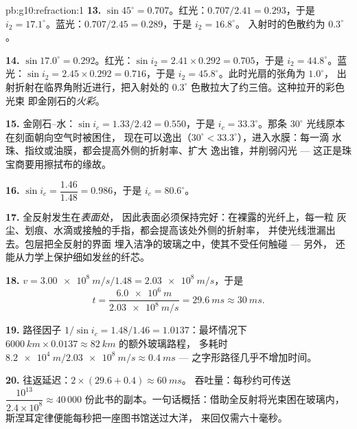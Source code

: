 \begin{solution}{pb:g10:refraction:1}
\textbf{13.} $\sin 45^\circ = 0.707$。红光：$0.707/2.41 = 0.293$，于是
$i_2 = 17.1^\circ$。蓝光：$0.707/2.45 = 0.289$，于是 $i_2 = 16.8^\circ$。
入射时的色散约为 $0.3^\circ$。

\textbf{14.} $\sin 17.0^\circ = 0.292$。红光：$\sin i_2 = 2.41 \times
0.292 = 0.705$，于是 $i_2 = 44.8^\circ$。蓝光：$\sin i_2 = 2.45 \times
0.292 = 0.716$，于是 $i_2 = 45.8^\circ$。此时光扇的张角为 $1.0^\circ$，
出射折射在临界角附近进行，把入射处的
$0.3^\circ$ 色散拉大了约三倍。这种拉开的彩色光束
即金刚石的\emph{火彩}。

\textbf{15.} 金刚石--水：$\sin i_c = 1.33/2.42 = 0.550$，于是
$i_c = 33.3^\circ$。那条 $30^\circ$ 光线原本在刻面朝向空气时被困住，
现在可以逸出（$30^\circ < 33.3^\circ$），进入水膜：每一滴
水珠、指纹或油膜，都会提高外侧的折射率、扩大
逸出锥，并削弱闪光 --- 这正是珠宝商要用擦拭布的缘故。

\textbf{16.} $\sin i_c = \dfrac{1.46}{1.48} = 0.986$，于是
$i_c = 80.6^\circ$。

\textbf{17.} 全反射发生在\emph{表面处}，
因此表面必须保持完好：在裸露的光纤上，每一粒
灰尘、划痕、水滴或接触的手指，都会提高该处外侧的折射率，
并使光线泄漏出去。包层把全反射的界面
埋入洁净的玻璃之中，使其不受任何触碰 --- 另外，
还能从力学上保护细如发丝的纤芯。

\textbf{18.} $v = \qty{3.00e8}{m/s}/1.48 = \qty{2.03e8}{m/s}$，于是
\[
t = \frac{\qty{6.0e6}{m}}{\qty{2.03e8}{m/s}} = \qty{29.6}{ms} \approx
\qty{30}{ms}.
\]

\textbf{19.} 路径因子 $1/\sin i_c = 1.48/1.46 = 1.0137$：最坏情况下
$\qty{6000}{km} \times 0.0137 \approx \qty{82}{km}$ 的额外玻璃路程，
多耗时 $\qty{8.2e4}{m} / \qty{2.03e8}{m/s} \approx \qty{0.4}{ms}$ ---
之字形路径几乎不增加时间。

\textbf{20.} 往返延迟：$2 \times (29.6 + 0.4) \approx \qty{60}{ms}$。
吞吐量：每秒约可传送 $\dfrac{10^{13}}{2.4 \times 10^8} \approx 40\,000$
份此书的副本。一句话概括：借助全反射将光束困在玻璃内，
斯涅耳定律便能每秒把一座图书馆送过大洋，
来回仅需六十毫秒。
\end{solution}

